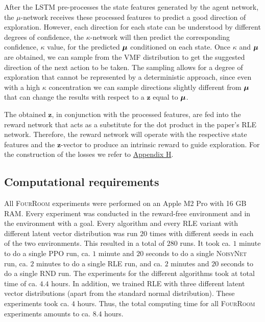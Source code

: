 \documentclass[10pt]{article} %
\begin{document}
After the LSTM pre-processes the state features generated by the agent network, the $\mu$-network receives these processed features to predict a good direction of exploration. However, each direction for each state can be understood by different degrees of confidence, the $\kappa$-network will then predict the corresponding confidence, $\kappa$ value, for the predicted ${\bm{\mu}}$ conditioned on each state. Once $\kappa$ and ${\bm{\mu}}$ are obtained, we can sample from the VMF distribution to get the suggested direction of the next action to be taken.  The sampling allows for a degree of exploration that cannot be represented by a deterministic approach, since even with a high $\kappa$ concentration we can sample directions slightly different from ${\bm{\mu}}$ that can change the results with respect to a $\mathbf{z}$ equal to ${\bm{\mu}}$.  

The obtained $\mathbf{z}$, in conjunction with the processed features, are fed into the reward network that acts as a substitute for the dot product in the paper's \textsc{RLE} network. Therefore, the reward network will operate with the respective state features and the $\mathbf{z}$-vector to produce an intrinsic reward to guide exploration. For the construction of the losses we refer to \hyperlink{na-vmf}{Appendix H}.

\hypertarget{computational-requirements}{\subsection{Computational requirements}}

All \textsc{FourRoom} experiments were performed on an Apple M2 Pro with 16 GB RAM. Every experiment was conducted in the reward-free environment and in the environment with a goal. Every algorithm and every \textsc{RLE} variant with different latent vector distribution was run $20$ times with different seeds in each of the two environments. This resulted in a total of $280$ runs. It took ca. $1$ minute to do a single \textsc{PPO} run, ca. $1$ minute and $20$ seconds to do a single \textsc{NoisyNet} run, ca. $2$ minutes to do a single \textsc{RLE} run, and ca. $2$ minutes and $20$ seconds to do a single \textsc{RND} run. The experiments for the different algorithms took at total time of ca. $4.4$ hours. In addition, we trained \textsc{RLE} with three different latent vector distributions (apart from the standard normal distribution). These experiments took ca. $4$ hours. Thus, the total computing time for all \textsc{FourRoom} experiments amounts to ca. $8.4$ hours.
\end{document}
